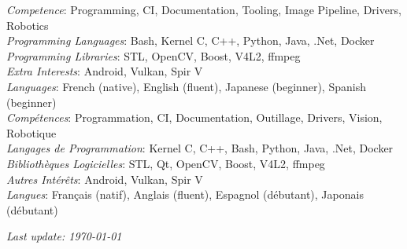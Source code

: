 \documentclass{article}
\begin{document}
\begin{llist}
 {
{\em Competence}: Programming, CI, Documentation, Tooling, Image Pipeline, Drivers, Robotics \\
{\em Programming Languages}: Bash, Kernel C, C++, Python, Java, .Net, Docker \\
{\em Programming Libraries}: STL, OpenCV, Boost, V4L2, ffmpeg \\
{\em Extra Interests}: Android, Vulkan, Spir V \\
{\em Languages}: French (native), English (fluent), Japanese (beginner), Spanish (beginner) \\
} {
{\em Comp\'{e}tences}: Programmation, CI, Documentation, Outillage, Drivers, Vision, Robotique \\
{\em Langages de Programmation}: Kernel C, C++, Bash, Python, Java, .Net, Docker \\
{\em Biblioth\`{e}ques Logicielles}: STL, Qt, OpenCV, Boost, V4L2, ffmpeg \\
{\em Autres Int\'{e}r\^{e}ts}: Android, Vulkan, Spir V \\
{\em Langues}: Fran\c{c}ais (natif), Anglais (fluent), Espagnol (d\'{e}butant), Japonais (d\'{e}butant) \\
}

 {
} {
}

\end{llist}

{\em Last update: \today}
\end{document}

